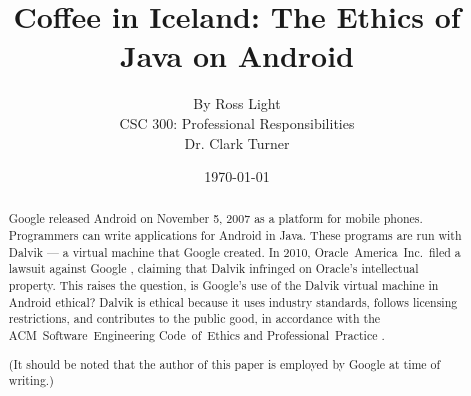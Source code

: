 \documentclass[11pt]{article}
\begin{document}
\title{\vfill Coffee in Iceland: The Ethics of Java on Android} %
\author{
By Ross Light \vspace{10pt} \\
CSC 300: Professional Responsibilities  \vspace{10pt} \\
Dr. Clark Turner \vspace{10pt} \\
}
\date{\today} %

\maketitle

\vfill  %
\begin{abstract} %

Google released Android on November 5, 2007 \cite{open-handset-alliance-ann} as
a platform for mobile phones. Programmers can write applications for Android in
Java.  These programs are run with Dalvik --- a virtual machine that Google
created.  In 2010, Oracle~America~Inc.\ filed a lawsuit against Google
\cite{oracle-lawsuit}, claiming that Dalvik infringed on Oracle's intellectual
property.  This raises the question, is Google's use of the Dalvik virtual
machine in Android ethical?  Dalvik is ethical because it uses industry
standards, follows licensing restrictions, and contributes to the public good,
in accordance with the ACM~Software~Engineering Code~of~Ethics and
Professional~Practice \cite{secode}.

(It should be noted that the author of this paper is employed by Google at time
of writing.)

\end{abstract} %

\thispagestyle{empty} %
\newpage

\thispagestyle{empty}  %
\tableofcontents

\newpage
\end{document}
